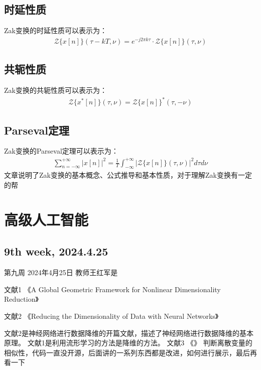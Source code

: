 \documentclass[12pt,a4paper]{article}%
\begin{document}
	\subsection{时延性质}
	Zak变换的时延性质可以表示为：
	\begin{equation}
	\label{eq10}
	\begin{aligned}
	\mathcal{Z}\{x[n]\}(\tau-kT, \nu) = e^{-j2\pi k\tau} \cdot \mathcal{Z}\{x[n]\}(\tau, \nu)
	\end{aligned}
	\end{equation}

	\subsection{共轭性质}
	Zak变换的共轭性质可以表示为：
	\begin{equation}
	\label{eq11}
	\begin{aligned}
	\mathcal{Z}\{x^*[n]\}(\tau, \nu) = \mathcal{Z}\{x[n]\}^*(\tau, -\nu)
	\end{aligned}
	\end{equation}

	\subsection{Parseval定理}
	Zak变换的Parseval定理可以表示为：
	\begin{equation}
	\label{eq12}
	\begin{aligned}
	\sum_{n=-\infty}^{+\infty}|x[n]|^2 = \frac{1}{T} \int_{-\infty}^{+\infty}|\mathcal{Z}\{x[n]\}(\tau, \nu)|^2 d\tau d\nu
	\end{aligned}
	\end{equation}
	文章说明了Zak变换的基本概念、公式推导和基本性质，对于理解Zak变换有一定的帮
	\section{高级人工智能}
	\subsection{9th week, 2024.4.25}
	第九周 2024年4月25日 教师王红军是

	文献1 《A Global Geometric Framework for Nonlinear Dimensionality Reduction》

	文献2 《Reducing the Dimensionality of Data with Neural Networks》

	文献2是神经网络进行数据降维的开篇文献，描述了神经网络进行数据降维的基本原理。
	文献1是利用流形学习的方法是降维的方法。
	文献3 《》
	判断离散变量的相似性，代码一直没开源，后面讲的一系列东西都是改进，如何进行展示，最后再看一下
\end{document}
